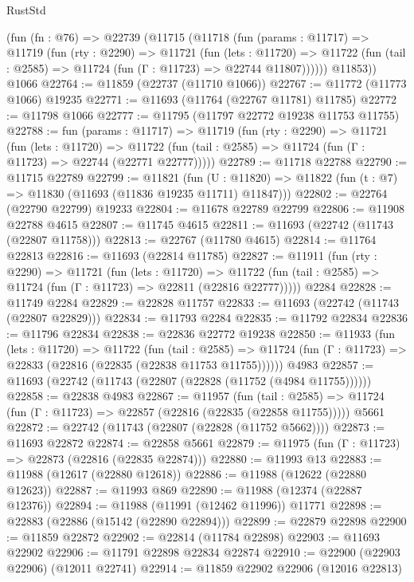 \begin{lexlean}{RustStd}
\begin{coremodule}
    (fun (fn : @76) =>
    @22739
      (@11715
        (@11718
          (fun (params : @11717) =>
          @11719
            (fun (rty : @2290) =>
            @11721
              (fun (lets : @11720) =>
              @11722 (fun (tail : @2585) => @11724 (fun (Γ : @11723) => @22744 @11807))))))
        @11853))
    @1066
@22764 := @11859 (@22737 (@11710 @1066))
@22767 := @11772 (@11773 @1066) @19235
@22771 := @11693 (@11764 (@22767 @11781) @11785)
@22772 := @11798 @1066
@22777 := @11795 (@11797 @22772 @19238 @11753 @11755)
@22788 := fun (params : @11717) =>
  @11719
    (fun (rty : @2290) =>
    @11721
      (fun (lets : @11720) =>
      @11722 (fun (tail : @2585) => @11724 (fun (Γ : @11723) => @22744 (@22771 @22777)))))
@22789 := @11718 @22788
@22790 := @11715 @22789
@22799 := @11821
    (fun (U : @11820) => @11822 (fun (t : @7) => @11830 (@11693 (@11836 @19235 @11711) @11847)))
@22802 := @22764 (@22790 @22799) @19233
@22804 := @11678 @22789 @22799
@22806 := @11908 @22788 @4615
@22807 := @11745 @4615
@22811 := @11693 (@22742 (@11743 (@22807 @11758)))
@22813 := @22767 (@11780 @4615)
@22814 := @11764 @22813
@22816 := @11693 (@22814 @11785)
@22827 := @11911
    (fun (rty : @2290) =>
    @11721
      (fun (lets : @11720) =>
      @11722 (fun (tail : @2585) => @11724 (fun (Γ : @11723) => @22811 (@22816 @22777)))))
    @2284
@22828 := @11749 @2284
@22829 := @22828 @11757
@22833 := @11693 (@22742 (@11743 (@22807 @22829)))
@22834 := @11793 @2284
@22835 := @11792 @22834
@22836 := @11796 @22834
@22838 := @22836 @22772 @19238
@22850 := @11933
    (fun (lets : @11720) =>
    @11722
      (fun (tail : @2585) =>
      @11724 (fun (Γ : @11723) => @22833 (@22816 (@22835 (@22838 @11753 @11755))))))
    @4983
@22857 := @11693 (@22742 (@11743 (@22807 (@22828 (@11752 (@4984 @11755))))))
@22858 := @22838 @4983
@22867 := @11957
    (fun (tail : @2585) => @11724 (fun (Γ : @11723) => @22857 (@22816 (@22835 (@22858 @11755)))))
    @5661
@22872 := @22742 (@11743 (@22807 (@22828 (@11752 @5662))))
@22873 := @11693 @22872
@22874 := @22858 @5661
@22879 := @11975 (fun (Γ : @11723) => @22873 (@22816 (@22835 @22874)))
@22880 := @11993 @13
@22883 := @11988 (@12617 (@22880 @12618))
@22886 := @11988 (@12622 (@22880 @12623))
@22887 := @11993 @869
@22890 := @11988 (@12374 (@22887 @12376))
@22894 := @11988 (@11991 (@12462 @11996)) @11771
@22898 := @22883 (@22886 (@15142 (@22890 @22894)))
@22899 := @22879 @22898
@22900 := @11859 @22872
@22902 := @22814 (@11784 @22898)
@22903 := @11693 @22902
@22906 := @11791 @22898 @22834 @22874
@22910 := @22900 (@22903 @22906) (@12011 @22741)
@22914 := @11859 @22902 @22906 (@12016 @22813)

\end{coremodule}
\end{lexlean}
